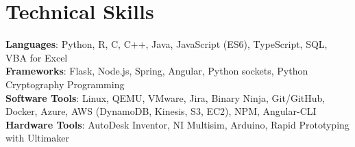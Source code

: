 \documentclass[letterpaper,11pt]{article}
\begin{document}
%
\section{Technical Skills}
 \begin{itemize}[leftmargin=0.15in, label={}]
    \small{\item{
     \textbf{Languages}{: Python, R, C, C++, Java, JavaScript (ES6), TypeScript, SQL, VBA for Excel} \\
     \textbf{Frameworks}{: Flask, Node.js, Spring, Angular, Python sockets, Python Cryptography Programming} \\
     \textbf{Software Tools}{: Linux, QEMU, VMware, Jira, Binary Ninja, Git/GitHub, Docker, Azure, AWS (DynamoDB, Kinesis, S3, EC2), NPM, Angular-CLI} \\
     \textbf{Hardware Tools}{: AutoDesk Inventor, NI Multisim, Arduino, Rapid Prototyping with Ultimaker}
    }}
 \end{itemize}


\end{document}
